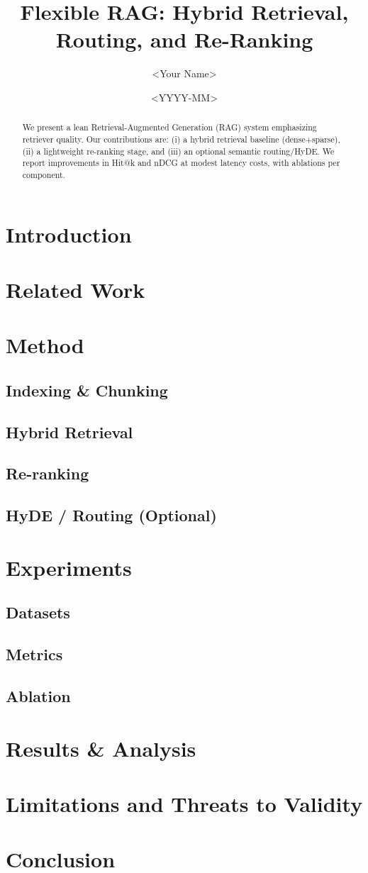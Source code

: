 \documentclass[10pt]{article}
\title{Flexible RAG: Hybrid Retrieval, Routing, and Re-Ranking}
\author{<Your Name>}
\date{<YYYY-MM>}
\begin{document}
\maketitle

\begin{abstract}
We present a lean Retrieval-Augmented Generation (RAG) system emphasizing retriever quality.
Our contributions are: (i) a hybrid retrieval baseline (dense+sparse), (ii) a lightweight
re-ranking stage, and (iii) an optional semantic routing/HyDE. We report improvements in Hit@k
and nDCG at modest latency costs, with ablations per component.
\end{abstract}

\section{Introduction}

\section{Related Work}

\section{Method}
\subsection{Indexing \& Chunking}
\subsection{Hybrid Retrieval}
\subsection{Re-ranking}
\subsection{HyDE / Routing (Optional)}

\section{Experiments}
\subsection{Datasets}
\subsection{Metrics}
\subsection{Ablation}

\section{Results \& Analysis}

\section{Limitations and Threats to Validity}

\section{Conclusion}



\end{document}
